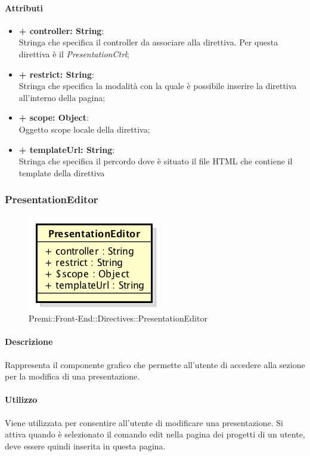 	\paragraph{Attributi}
	\begin{itemize}
		\item \textbf{+ controller: String}:\\
			Stringa che specifica il controller da associare alla direttiva. Per questa direttiva è il \textit{PresentationCtrl};
		\item \textbf{+ restrict: String}:\\
			Stringa che specifica la modalità con la quale è possibile inserire la direttiva all'interno della pagina;
		\item \textbf{+ scope: Object}:\\
			Oggetto scope locale della direttiva;
		\item \textbf{+ templateUrl: String}:\\
			Stringa che specifica il percordo dove è situato il file \gls{HTML} che contiene il \gls{template} della direttiva
	\end{itemize}
\newpage


\subsubsection{PresentationEditor}
	\begin{figure}[h]
		\centering
		\includegraphics[width=0.4\linewidth]{img/premi_front_end_directives_presentationeditor}
		\caption[Premi::Front-End::Directives::PresentationEditor]{Premi::Front-End::Directives::PresentationEditor}
	\end{figure}
	
	\paragraph{Descrizione}
	Rappresenta il componente grafico che permette all'utente di accedere alla sezione per la modifica di una presentazione.
	
	\paragraph{Utilizzo}
	Viene utilizzata per consentire all'utente di modificare una presentazione. Si attiva quando è selezionato il comando edit nella pagina dei progetti di un utente, deve essere quindi inserita in questa pagina.
	
